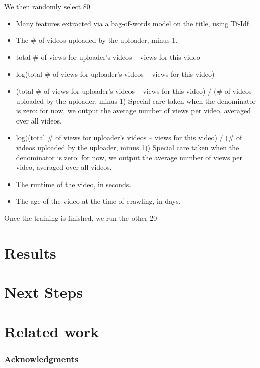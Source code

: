 \documentclass{article} %
\begin{document}
We then randomly select 80%

\begin{itemize}
\item
Many features extracted via a bag-of-words model on the title, using Tf-Idf.
\item
The \# of videos uploaded by the uploader, minus 1.
\item
total \# of views for uploader's videos – views for this video
\item
log(total \# of views for uploader's videos – views for this video)
\item
(total \# of views for uploader's videos – views for this video) / (\# of videos uploaded by the uploader, minus 1)
Special care taken when the denominator is zero: for now, we output the average number of views per video, averaged over all videos.
\item
log((total \# of views for uploader's videos – views for this video) / (\# of videos uploaded by the uploader, minus 1))
Special care taken when the denominator is zero: for now, we output the average number of views per video, averaged over all videos.
\item
The runtime of the video, in seconds.
\item
The age of the video at the time of crawling, in days.
\end{itemize}

Once the training is finished, we run the other 20%

\section{Results}

\section{Next Steps}


\section{Related work}

\subsubsection*{Acknowledgments}
\end{document}
